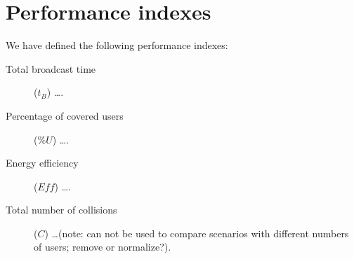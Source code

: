 \section{Performance indexes}\label{sec:indexes}

We have defined the following performance indexes:
\begin{description}
	\item[Total broadcast time] (\(t_B\)) \ldots.
	\item[Percentage of covered users] (\(\mathit{\%U}\)) \ldots.
	\item[Energy efficiency] (\(\mathit{Eff}\)) \ldots.
	\item[Total number of collisions] (\(C\)) \ldots (note: can not be used
		to compare scenarios with different numbers of users; remove or
		normalize?).
\end{description}
